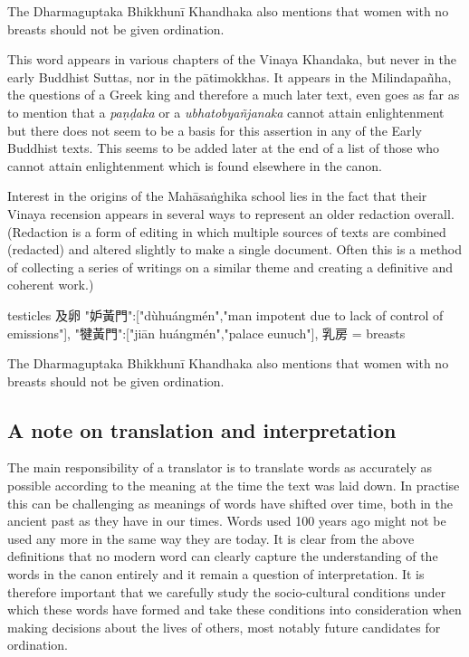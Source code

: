 The Dharmaguptaka Bhikkhunī Khandhaka also mentions that women with no breasts should not be given ordination.

This word appears in various chapters of the Vinaya Khandaka, but never in the early Buddhist Suttas, nor in the pātimokkhas. It appears in the Milindapañha, the questions of a Greek king and therefore a much later text, even goes as far as to mention that a {\em paṇḍaka } or a {\em ubhatob­yañ­janaka } cannot attain enlightenment but there does not seem to be a basis for this assertion in any of the Early Buddhist texts. This seems to be added later at the end of a list of those who cannot attain enlightenment which is found elsewhere in the canon.

Interest in the origins of the Mahāsaṅghika school lies in the fact that their Vinaya recension appears in several ways to represent an older redaction overall. (Redaction is a form of editing in which multiple sources of texts are combined (redacted) and altered slightly to make a single document. Often this is a method of collecting a series of writings on a similar theme and creating a definitive and coherent work.)

testicles 及卵
"妒黃門":["dùhuángmén","man impotent due to lack of control of emissions"],
"犍黃門":["jiān huángmén","palace eunuch"],
乳房 = breasts

The Dharmaguptaka Bhikkhunī Khandhaka also mentions that women with no breasts should not be given ordination.

\subsection{A note on translation and interpretation}
The main responsibility of a translator is to translate words as accurately as possible according to the meaning at the time the text was laid down. In practise this can be challenging as meanings of words have shifted over time, both in the ancient past as they have in our times. Words used 100 years ago might not be used any more in the same way they are today. It is clear from the above definitions that no modern word can clearly capture the understanding of the words in the canon entirely and it remain a question of interpretation. It is therefore important that we carefully study the socio-cultural conditions under which these words have formed and take these conditions into consideration when making decisions about the lives of others, most notably future candidates for ordination.


